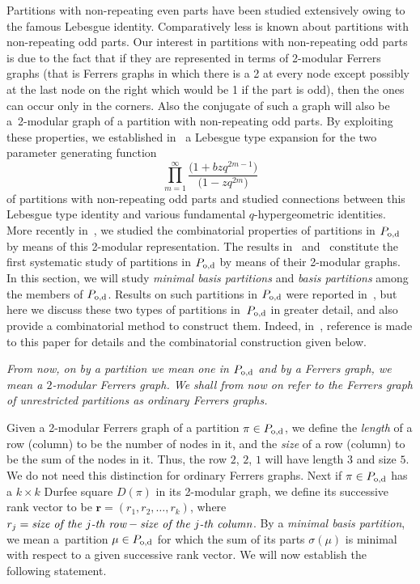 \documentclass[10pt,a4paper]{amsart}
\numberwithin{equation}{section}
\theoremstyle{definition}
\begin{document}
Partitions with non-repeating even parts have been studied extensively owing
to the famous Lebesgue identity. Comparatively less is known about partitions
with non-repeating odd parts. Our interest in partitions with non-repeating
odd parts is due to the fact that if they are represented in terms of 2-modular
Ferrers graphs (that is Ferrers graphs in which there is a 2 at every node
except possibly at the last node on the right which would be 1 if the part
is odd), then the ones can occur only in the corners. Also the conjugate of
such a graph will also be a~2-modular graph of a partition with non-repeating
odd parts. By exploiting these properties, we established in~\cite{Al2010} a Lebesgue
type expansion for the two parameter generating function
\[
\prod^{\infty}_{m=1}\frac{\bigl(1+bzq^{2m-1}\bigr)}{\bigl(1-zq^{2m}\bigr)}
\]
of partitions with non-repeating odd parts and studied connections between this
Lebesgue type identity and various fundamental $q$-hypergeometric identities.
More recently in~\cite{Al2016}, we studied the combinatorial properties of partitions in
$P_{\rm o,d}$ by means of this 2-modular representation. The results in~\cite{Al2010} and~\cite{Al2016}
constitute the first systematic study of partitions in $P_{\rm o,d}$ by means of
their 2-modular graphs. In this section, we will study {\it minimal basis partitions}
and {\it basis partitions} among
the members of $P_{\rm o,d}$. Results on such partitions in $P_{\rm o,d}$ were reported
in~\cite{Al2016}, but here we discuss these two types of partitions in~$P_{\rm o,d}$ in greater detail, and also provide a combinatorial method to construct them. Indeed, in~\cite{Al2016}, reference is made to this paper for details and the combinatorial construction given below.

{\it From now, on by a partition we mean one in $P_{\rm o,d}$ and by a Ferrers graph, we mean a $2$-modular Ferrers graph. We shall from now on refer to the Ferrers graph of unrestricted partitions as ordinary Ferrers graphs.}

Given a 2-modular Ferrers graph of a partition $\pi\in P_{\rm o,d}$, we define
the {\it length} of a row (column) to be the number of nodes in it, and the
{\it size} of a row (column) to be the sum of the nodes in it. Thus, the
row $2$, $2$, $1$ will have length $3$ and size $5$. We do not need this distinction
for ordinary Ferrers graphs.
Next if $\pi\in P_{\rm o,d}$ has a $k\times k$ Durfee square $D(\pi)$ in its
2-modular graph, we define its successive rank vector to be
$\mathbf{r}=(r_1,r_2,\dots ,r_k)$, where
$
r_j= \text{\it size of the $j$-th row} - \text{\it size of the $j$-th column}$.
By a {\it minimal basis partition}, we mean a~partition $\mu\in P_{\rm o,d}$ for
which the sum of its parts $\sigma(\mu)$ is minimal with respect to a given
successive rank vector. We will now establish the following statement.
\end{document}
